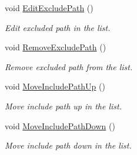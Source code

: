 \begin{DoxyCompactItemize}
void \hyperlink{class_project_file_dialog_ac0a1845defc93112d8ad4d531c7f5c91}{Edit\-Exclude\-Path} ()
\begin{DoxyCompactList}\small\item\em Edit excluded path in the list. \end{DoxyCompactList}\item 
void \hyperlink{class_project_file_dialog_a028910a437db90a74e50c3123bd97a0c}{Remove\-Exclude\-Path} ()
\begin{DoxyCompactList}\small\item\em Remove excluded path from the list. \end{DoxyCompactList}\item 
void \hyperlink{class_project_file_dialog_af617ae3655a406e6d0df08cb1e6e9e5c}{Move\-Include\-Path\-Up} ()
\begin{DoxyCompactList}\small\item\em Move include path up in the list. \end{DoxyCompactList}\item 
void \hyperlink{class_project_file_dialog_a022fe5ffecf011683d59bc7475ecc100}{Move\-Include\-Path\-Down} ()
\begin{DoxyCompactList}\small\item\em Move include path down in the list. \end{DoxyCompactList}\end{DoxyCompactItemize}
